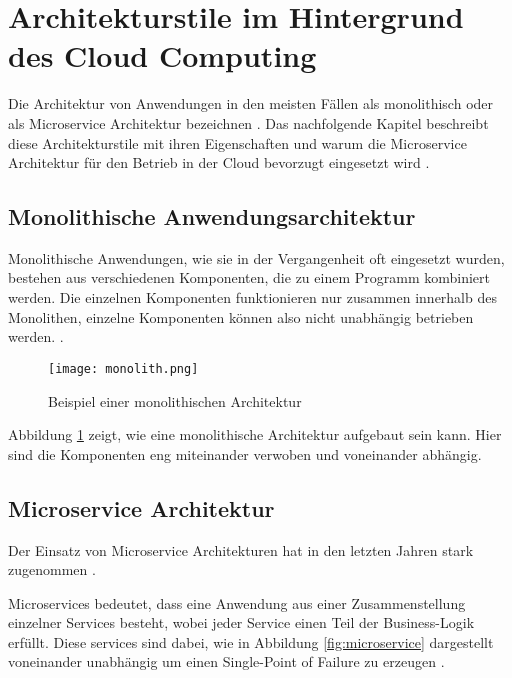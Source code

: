 \section{Architekturstile im Hintergrund des Cloud Computing}
\label{sec:architekturstile}
Die Architektur von Anwendungen in den meisten Fällen als monolithisch oder als Microservice Architektur bezeichnen \cite[Vgl.][S. 150]{Gos2020}. Das nachfolgende Kapitel beschreibt diese Architekturstile mit ihren Eigenschaften und warum die Microservice Architektur für den Betrieb in der Cloud bevorzugt eingesetzt wird \cite[Vgl.][S. 1]{Villamizar2015}.

\subsection{Monolithische Anwendungsarchitektur}
Monolithische Anwendungen, wie sie in der Vergangenheit oft eingesetzt wurden, bestehen aus verschiedenen Komponenten, die zu einem Programm kombiniert werden. Die einzelnen Komponenten funktionieren nur zusammen innerhalb des Monolithen, einzelne Komponenten können also nicht unabhängig betrieben werden. \cite[Vgl.][S. 1]{Gos2020}.

\begin{figure}[H]
    \centering
    \texttt{[image: monolith.png]}
    \caption{Beispiel einer monolithischen Architektur \cite[Nachbildung angelehnt an][S. 150]{Gos2020}}
    \label{fig:monolith}
\end{figure}

Abbildung \ref{fig:monolith} zeigt, wie eine monolithische Architektur aufgebaut sein kann. Hier sind die Komponenten eng miteinander verwoben und voneinander abhängig.
\pagebreak

\subsection{Microservice Architektur}
Der Einsatz von Microservice Architekturen hat in den letzten Jahren stark zugenommen \cite[Vgl.][S. 150]{Gos2020}.

Microservices bedeutet, dass eine Anwendung aus einer Zusammenstellung einzelner Services besteht, wobei jeder Service einen Teil der Business-Logik erfüllt. Diese services sind dabei, wie in Abbildung \ref{fig:microservice} dargestellt voneinander unabhängig um einen Single-Point of Failure zu erzeugen \cite[Vgl.][S. 150]{Gos2020}\cite[Vgl.][]{Janssen2021}\cite[Vgl.][]{Fowler2014}.

